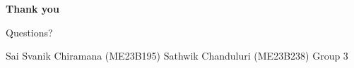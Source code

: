 \documentclass[aspectratio=169,10pt]{beamer}
\begin{document}
\begin{frame}[plain]
  \centering
  \vspace*{2.2cm}
  {\Huge\bfseries Thank you\par}
  \vspace{0.6cm}
  {\large Questions?\par}
  \vspace{1.2cm}
  {\small Sai Svanik Chiramana (ME23B195) \qquad Sathwik Chanduluri (ME23B238) \qquad Group 3\par}
\end{frame}
\end{document}
